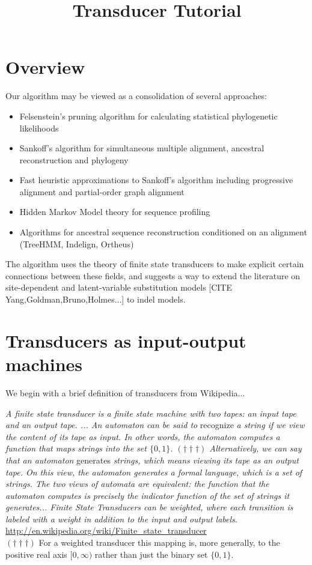 \documentclass{article}
\newcommand{\needcite}[1]{[CITE #1]}
\begin{document}
\title{Transducer Tutorial}
\date{}
\maketitle

\section{Overview}

Our algorithm may be viewed as a consolidation of several approaches:
\begin{itemize}
\item Felsenstein's pruning algorithm for calculating statistical phylogenetic likelihoods
\item Sankoff's algorithm for simultaneous multiple alignment, ancestral reconstruction and phylogeny
\item Fast heuristic approximations to Sankoff's algorithm including progressive alignment and partial-order graph alignment
\item Hidden Markov Model theory for sequence profiling
\item Algorithms for ancestral sequence reconstruction conditioned on an alignment (TreeHMM, Indelign, Ortheus)
\end{itemize}

The algorithm uses the theory of finite state transducers to make explicit certain connections between these fields,
and suggests a way to extend the literature on
site-dependent and latent-variable substitution models \needcite{Yang,Goldman,Bruno,Holmes...}
to indel models.

\section{Transducers as input-output machines}

We begin with a brief definition of transducers from Wikipedia...

{\em A finite state transducer is a finite state machine with two tapes: an input tape and an output tape. ... An automaton can be said to } recognize {\em a string if we view the content of its tape as input. In other words, the automaton computes a function that maps strings into the set $\{0,1\}$. $(\dagger\dagger\dagger)$ Alternatively, we can say that an automaton } generates {\em strings, which means viewing its tape as an output tape. On this view, the automaton generates a formal language, which is a set of strings. The two views of automata are equivalent: the function that the automaton computes is precisely the indicator function of the set of strings it generates... Finite State Transducers can be weighted, where each transition is labeled with a weight in addition to the input and output labels. }
\url{http://en.wikipedia.org/wiki/Finite_state_transducer}
\\
$(\dagger\dagger\dagger)$ For a weighted transducer this mapping is,
more generally, to the positive real axis $[0,\infty)$
rather than just the binary set $\{0,1\}$.
\end{document}
